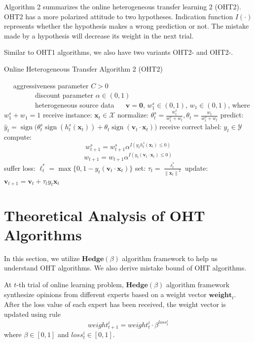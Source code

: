 \documentclass[letterpaper]{article}
\theoremstyle{remark}
\theoremstyle{definition}
\DeclareMathOperator{\sign}{sign}
\begin{document}
Algorithm 2 summarizes the online heterogeneous transfer learning 2 (OHT2).
OHT2 has a more polarized attitude to two hypotheses.
Indication function $I(\cdot)$ represents whether the hypothesis makes a wrong prediction or not.
The mistake made by a hypothesis will decrease its weight in the next trial.

Similar to OHT1 algorithms, we also have two variants OHT2-\uppercase\expandafter{} and OHT2-\uppercase\expandafter{}.

\begin{algorithm}
\begin{algorithmic}[1]
\caption{Online Heterogeneous Transfer Algorithm 2 (OHT2)}
\REQUIRE ~~
aggressiveness parameter $C>0$\\ 
~~~~~~~~~discount parameter $\alpha \in (0,1)$\\ 
~~~~~~~~~heterogeneous source data 
\ENSURE ~~
$\mathbf{v} = \mathbf{0}$, $w_{1}^{s} \in (0,1)$, $w_{1} \in (0,1)$, where $w_{1}^{s} + w_1 = 1$
\STATE 
  receive instance: $\mathbf{x}_t \in \mathcal{X}$
\STATE
  normalize: $\theta_{t}^{s} = \frac{w_{t}^{s}}{w_{t}^{s}+w_t}, \theta_{t} = \frac{w_{t}}{w_{t}^{s}+w_t}$
\STATE
  predict: $\hat{y}_t = \sign \big( \theta_{t}^{s} \sign (h_{t}^{s}(\mathbf{x}_t)) + \theta_{t} \sign (\mathbf{v}_t \cdot \mathbf{x}_t) \big)$
\STATE
  receive correct label: $y_t \in \mathcal{Y}$
\STATE
  compute: 
    $$w_{t+1}^{s} = w_{t+1}^{s} \alpha ^ {I(y_t h_{t}^{s}(\mathbf{x}_t) \leq 0)}  $$
    $$w_{t+1} = w_{t+1} \alpha ^ {I(y_t (\mathbf{v}_t \cdot \mathbf{x}_t) \leq 0)}  $$
\STATE
  suffer loss: $\ell_{t}^{*} = \max \{0, 1-y_t(\mathbf{v}_t \cdot \mathbf{x}_t)\}$
\STATE
  set: $\tau_t = \frac{\ell_{t}^{*}}{{\|\mathbf{x}_t\|}^2}$
\STATE
  update: $ \mathbf{v}_{t+1} = \mathbf{v}_t + \tau_t y_t \mathbf{x}_t $
\ENDFOR
\end{algorithmic}
\end{algorithm}


\section{Theoretical Analysis of OHT Algorithms}
In this section, we utilize $\mathbf{Hedge}(\beta)$ algorithm framework to help us understand OHT algorithms.
We also derive mistake bound of OHT algorithms.

At $t$-th trial of online learning problem, $\mathbf{Hedge}(\beta)$ algorithm framework synthesize opinions from different experts based on a weight vector $\mathbf{weight}_t$.
After the loss value of each expert has been received, the weight vector is updated using rule
$$ weight_{t+1}^{i} = weight_{t}^{i} \cdot \beta^{loss_{t}^{i}} $$
where $\beta \in [0,1]$ and $loss_{t}^{i} \in [0,1]$.
\end{document}
